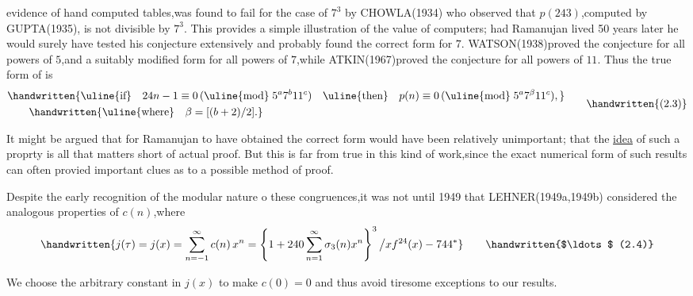 \noindent evidence of hand computed tables,was found to fail for the case of $7^{3}$ by CHOWLA(1934) who observed that $p(243)$,computed by GUPTA(1935), is not divisible by $7^{3}$. This provides a simple illustration of the value of computers; had Ramanujan lived 50 years later he would surely have tested his conjecture extensively and probably found the correct form for $7$. WATSON(1938)proved the conjecture for all powers of $5$,and a suitably modified form for all powers of $7$,while ATKIN(1967)proved the conjecture for all powers of $11$. Thus the true form of  is
\[
\begin{aligned}
&\handwritten{\text{\uline{if}}\quad 24n-1\equiv0\,(\text{\uline{mod}}\;5^{a}7^{b}11^{c})\quad
\text{\uline{then}}\quad p(n)\equiv0\,(\text{\uline{mod}}\;5^{a}7^{\beta}11^{c}),}\\
&\qquad\handwritten{\text{\uline{where}}\quad \beta=[(b+2)/2].}
\end{aligned}
\tag*{\handwritten{(2.3)}}
\]

It might be argued that for Ramanujan to have obtained the correct form would have been relatively unimportant; that the \uline{idea} of such a proprty is all that matters short of actual proof. But this is far from true in this kind of work,since the exact numerical form of such results can often provied important clues as to a possible method of proof.

Despite the early recognition of the modular nature o these congruences,it was not until 1949 that LEHNER(1949a,1949b) considered the analogous properties of $c(n)$,where
\[
\handwritten{j(\tau)=j(x)=\sum_{n=-1}^{\infty}c(n)\,x^{n}
=\left\{1+240\sum_{n=1}^{\infty}\sigma_{3}(n)x^{n}\right\}^{3}\big/xf^{24}(x)-744^{*}}
\tag*{\handwritten{$\ldots$ (2.4)}}
\]

\noindent\handwritten{\rule{\linewidth}{0.4pt}}

\noindent *We choose the arbitrary constant in $j(x)$ to make $c(0)=0$ and thus avoid tiresome exceptions to our results.


